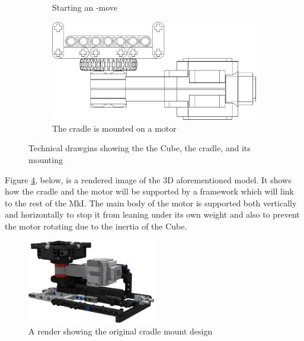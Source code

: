 \documentclass{report}
\newcommand{\move}[1]{\uppercase{\texttt{\formatmovesnospace{#1}}}-move}
\begin{document}
\begin{figure}[H]
\begin{subfigure}[b]{0.2\textwidth}
    		\caption{Starting an \move{x}}
    		\label{fig:dwgCradleCurvedEdgeTilted}
    	\end{subfigure}
	    \hspace{10mm}
	    \begin{subfigure}[b]{0.4\textwidth}
	    	\includegraphics[width=\textwidth]{Resources/Images/dwgCradleProfileV1.png}
	    	\caption{The cradle is mounted on a motor}
	    	\label{fig:dwgCradleProfileV1}
	    \end{subfigure}
    	\caption{Technical drawgins showing the the Cube, the cradle, and its mounting}
    	\label{fig:CradleDrawings}
    \end{figure}    
    
    Figure \ref{fig:rdrCradleMountedRotor}, below, is a rendered image of the 3D aforementioned model. It shows how the cradle and the motor will be supported by a framework which will link to the rest of the MkI. The main body of the motor is supported both vertically and horizontally to stop it from leaning under its own weight and also to prevent the motor rotating due to the inertia of the Cube.
    
    \begin{figure}[H]
    	\begin{center}
    		\includegraphics[width=0.5\textwidth]{Resources/Images/rdrCradleMountedRotor.png}
    		\caption{A render showing the original cradle mount design}
    		\label{fig:rdrCradleMountedRotor}
    	\end{center}
    \end{figure}
    
\end{document}
